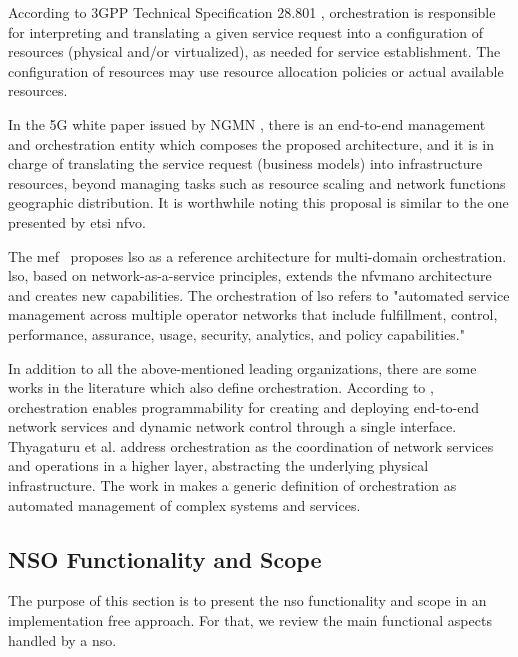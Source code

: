 According to 3GPP Technical Specification 28.801 \cite{3GPP2017TRNetwork}, orchestration is responsible for interpreting and translating a given service request into a configuration of resources (physical and/or virtualized), as needed for service establishment. The configuration of resources may use resource allocation policies or actual available resources. 

In the 5G white paper issued by NGMN \cite{NGMNAlliance2015NGMNPaper}, there is an end-to-end management and orchestration entity which composes the proposed architecture, and it is in charge of translating the service request (business models) into infrastructure resources, beyond managing tasks such as resource scaling and network functions geographic distribution. It is worthwhile noting this proposal is similar to the one presented by \gls{etsi} \gls{nfvo}.  

The \gls{mef}~\cite{MEF:Third:2015} proposes \gls{lso} as a reference architecture for multi-domain orchestration. \gls{lso}, based on network-as-a-service principles, extends the \gls{nfvmano} architecture and creates new capabilities. The orchestration of \gls{lso} refers to "automated service management across multiple operator networks that include fulfillment, control, performance, assurance, usage, security, analytics, and policy capabilities."

In addition to all the above-mentioned leading organizations, there are some works in the literature which also define orchestration. According to \cite{Rostami2016Multi-Domain5G}, orchestration enables programmability for creating and deploying end-to-end network services and dynamic network control through a single interface. Thyagaturu et al. \cite{Thyagaturu2016SoftwareSurvey} address orchestration as the coordination of network services and operations in a higher layer, abstracting the underlying physical infrastructure. The work in \cite{Guerzoni2016Multi-domainApproach} makes a generic definition of orchestration as automated management of complex systems and services.

\subsection{NSO Functionality and Scope}
\label{sec:def}

The purpose of this section is to present the \gls{nso} functionality and scope in an implementation free approach. For that, we review the main functional aspects handled by a \gls{nso}.

